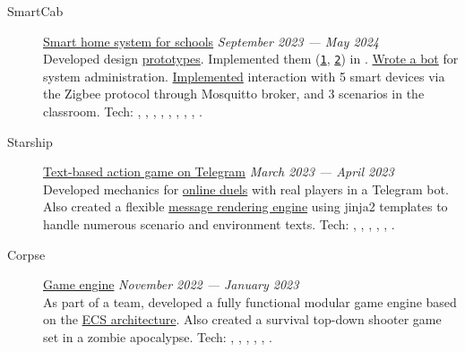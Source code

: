 \documentclass[margin,line]{resume}
\begin{document}
\begin{resume}
\begin{description}
    \item[SmartCab]\small{\href{https://github.com/smart-cab}{Smart home system for schools} \hfill
      \textsl{September 2023 — May 2024\vspace{1mm}}}\\
      Developed design \href{https://www.figma.com/design/8H1tFpxgmIDV1xp06ndi73/SmartCab?node-id=0-1&p=f}{prototypes}.
      Implemented them
      (\texttt{\href{https://github.com/smart-cab/smart-cab-hub/tree/main/frontend/src}{1}},
      \texttt{\href{https://github.com/smart-cab/smart-cab-dashboard/tree/main/frontend/src}{2}})
      in .
      \href{https://github.com/smart-cab/smartcab-bot}{Wrote a bot}
      for system administration.
      \href{https://github.com/smart-cab/smartcab-hub/blob/main/backend/smartcab/interface/mqtt.py}{Implemented}
      interaction with 5 smart devices via the Zigbee protocol through
      Mosquitto broker, and 3 scenarios in the classroom.
      Tech: , ,
      , ,
      ,
      , ,
      , .
      \vspace{3mm}

    \item[Starship]\small{\href{https://github.com/starship-crew}{Text-based action game on Telegram} \hfill
      \textsl{March 2023 — April 2023\vspace{1mm}}}\\
      Developed mechanics for
      \href{https://github.com/starship-crew/telegram-client/blob/main/app/handlers/fight.py}{online duels}
      with real players in a Telegram bot. Also created a flexible
      \href{https://github.com/starship-crew/telegram-client/blob/main/app/template.py}{message rendering engine}
      using jinja2 templates to handle numerous scenario and environment texts.
      Tech: , ,
      ,
      , ,
      .
      \vspace{3mm}

    \item[Corpse]\small{\href{https://github.com/corpse-inc/corpse}{Game engine} \hfill
      \textsl{November 2022 — January 2023\vspace{1mm}}}\\
      As part of a team, developed a fully functional modular game engine
      based on the \href{https://en.wikipedia.org/wiki/Entity_component_system#:~:text=Entity%E2%80%93component%E2%80%93system%20(ECS,Entity%E2%80%93Component%E2%80%93System%20layout.}{ECS architecture}.
      Also created a survival top-down shooter game set in a zombie apocalypse.
      Tech: , ,
      , , ,
      .


\end{description}
\end{resume}
\end{document}
